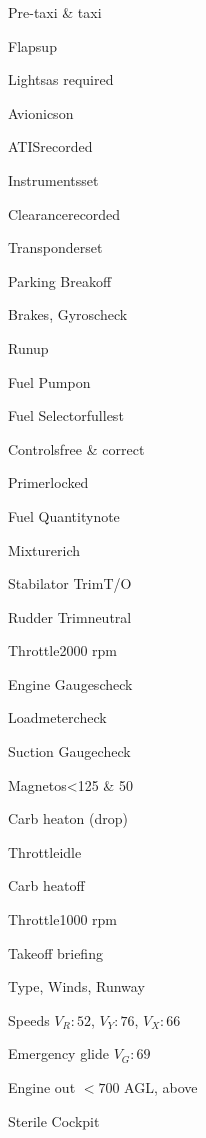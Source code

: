\begin{multicols}{2}
\begin{checklist}{Pre-taxi \& taxi}
    \item{Flaps}{up}
    \item{Lights}{as required}
    \item{Avionics}{on}
    \item{ATIS}{recorded}
    \item{Instruments}{set}
    \item{Clearance}{recorded}
    \item{Transponder}{set}
    \item{Parking Break}{off}
    \item{Brakes, Gyros}{check}
\end{checklist}

\begin{checklist}{Runup}
    \item{Fuel Pump}{on}
    \item{Fuel Selector}{fullest}
    \item{Controls}{free \& correct}
    \item{Primer}{locked}
    \item{Fuel Quantity}{note}
    \item{Mixture}{rich}
    \item{Stabilator Trim}{T/O}
    \item{Rudder Trim}{neutral}
    \item{Throttle}{2000 rpm}
    \item{Engine Gauges}{check}
    \item{Loadmeter}{check}
    \item{Suction Gauge}{check}
    \item{Magnetos}{<125 \& 50}
    \item{Carb heat}{on (drop)}
    \item{Throttle}{idle}
    \item{Carb heat}{off}
    \item{Throttle}{1000 rpm}
\end{checklist}

\begin{checklist}{Takeoff briefing}
    \item{Type, Winds, Runway}{}
    \item{Speeds $V_R: 52$, $V_Y: 76$, $V_X: 66$}{}
    \item{Emergency glide $V_G: 69$}{}
    \item{Engine out $<700$ AGL, above}{}
    \item{Sterile Cockpit}{}
\end{checklist}


\end{multicols}
